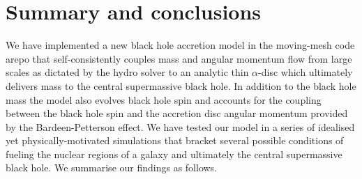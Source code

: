 \documentclass[a4paper,fleqn,usenatbib]{mnras}
\begin{document}

\section{Summary and conclusions} \label{sec_conclusions}

We have implemented a new black hole accretion model in the moving-mesh code {\sc arepo} that self-consistently couples mass and angular momentum flow from large scales as dictated by the hydro solver to an analytic thin $\alpha$-disc which ultimately delivers mass to the central supermassive black hole.
In addition to the black hole mass the model also evolves black hole spin and accounts for the coupling between the black hole spin and the accretion disc angular momentum provided by the Bardeen-Petterson effect.
We have tested our model in a series of idealised yet physically-motivated simulations that bracket several possible conditions of fueling the nuclear regions of a galaxy and ultimately the central supermassive black hole.
We summarise our findings as follows. 
\end{document}
